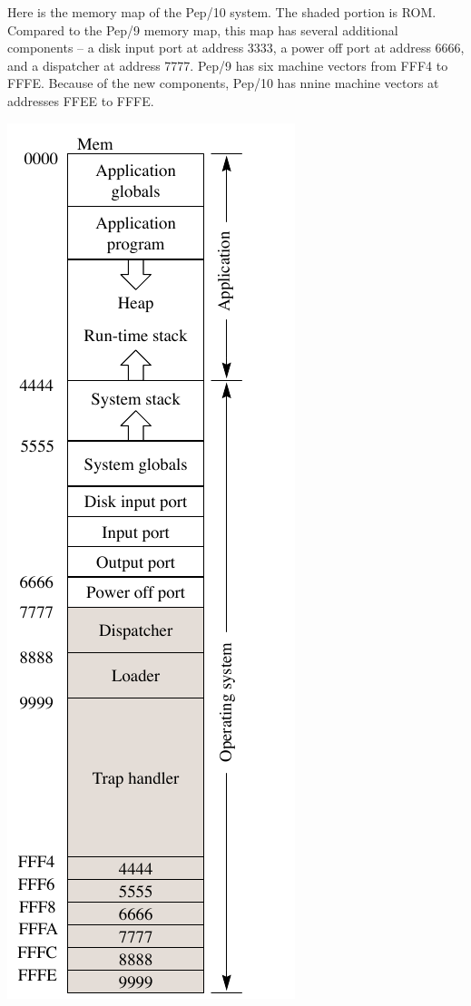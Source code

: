\documentclass[10pt,fleqn]{book}
\begin{document}
\newpage

\noindent Here is the memory map of the Pep/10 system.
The shaded portion is ROM.
Compared to the Pep/9 memory map, this map has several additional components -- a disk input port at address 3333, a power off port at address 6666, and a dispatcher at address 7777.
Pep/9 has six machine vectors from FFF4 to FFFE.
Because of the new components, Pep/10 has nnine machine vectors at addresses FFEE to FFFE.\\
\begin{center}
\includegraphics{pep10-memory-map}
\end{center}
\end{document}
